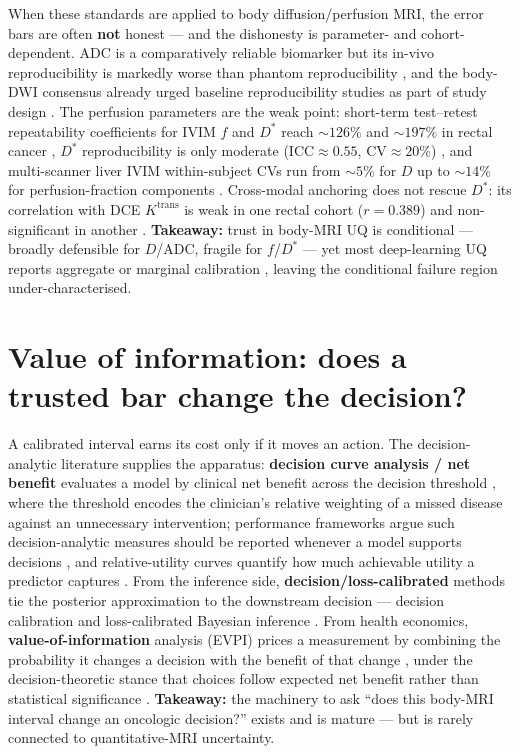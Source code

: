 \documentclass[review,number]{elsarticle}
\newcommand{\Dstar}{D^{*}}
\newcommand{\Ktrans}{K^{\mathrm{trans}}}
\begin{document}
When these standards are applied to body diffusion/perfusion MRI, the error bars are
often \textbf{not} honest --- and the dishonesty is parameter- and cohort-dependent. ADC
is a comparatively reliable biomarker but its in-vivo reproducibility is markedly worse
than phantom reproducibility \cite{miquel2016}, and the body-DWI consensus already urged
baseline reproducibility studies as part of study design \cite{koh2007,padhani2009}. The
perfusion parameters are the weak point: short-term test--retest repeatability
coefficients for IVIM $f$ and $\Dstar$ reach ${\sim}126\%$ and ${\sim}197\%$ in rectal
cancer \cite{sun2017}, $\Dstar$ reproducibility is only moderate
($\mathrm{ICC}\approx0.55$, $\mathrm{CV}\approx20\%$) \cite{yang2019}, and multi-scanner
liver IVIM within-subject CVs run from ${\sim}5\%$ for $D$ up to ${\sim}14\%$ for
perfusion-fraction components \cite{simchick2024}. Cross-modal anchoring does not rescue
$\Dstar$: its correlation with DCE $\Ktrans$ is weak in one rectal cohort ($r=0.389$)
\cite{sun2019} and non-significant in another \cite{yang2019}. \textbf{Takeaway:} trust
in body-MRI UQ is conditional --- broadly defensible for $D$/ADC, fragile for
$f$/$\Dstar$ --- yet most deep-learning UQ reports aggregate or marginal calibration
\cite{casali2025}, leaving the conditional failure region under-characterised.

\section{Value of information: does a trusted bar change the decision?}
\label{sec:voi}

A calibrated interval earns its cost only if it moves an action. The decision-analytic
literature supplies the apparatus: \textbf{decision curve analysis / net benefit}
evaluates a model by clinical net benefit across the decision threshold
\cite{vickers2006,vickers2016,vickers2019}, where the threshold encodes the clinician's
relative weighting of a missed disease against an unnecessary intervention; performance
frameworks argue such decision-analytic measures should be reported whenever a model
supports decisions \cite{steyerberg2010}, and relative-utility curves quantify how much
achievable utility a predictor captures \cite{baker2009}. From the inference side,
\textbf{decision/loss-calibrated} methods tie the posterior approximation to the
downstream decision --- decision calibration \cite{zhao2021} and loss-calibrated
Bayesian inference \cite{lacostejulien2011,vadera2021}. From health economics,
\textbf{value-of-information} analysis (EVPI) prices a measurement by combining the
probability it changes a decision with the benefit of that change \cite{felli1998},
under the decision-theoretic stance that choices follow expected net benefit rather than
statistical significance \cite{claxton1999}. \textbf{Takeaway:} the machinery to ask
``does this body-MRI interval change an oncologic decision?'' exists and is mature ---
but is rarely connected to quantitative-MRI uncertainty.
\end{document}
